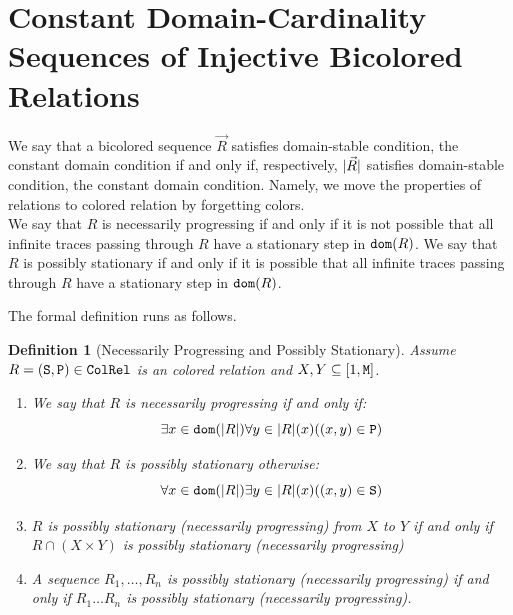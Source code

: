 \documentclass{lmcs}
\newtheorem{definition}[theorem]{Definition}
\begin{document}
\section{Constant Domain-Cardinality Sequences of Injective Bicolored Relations}



We say that  a bicolored sequence $\vec{R}$ satisfies domain-stable
condition, the constant domain condition if and only if, respectively, ${| \vec{R} |}$
satisfies domain-stable
condition, the constant domain condition. Namely, we move the properties of relations to 
colored relation by forgetting colors.
\\

We say that $R$ is necessarily progressing if and only if it is not possible that all infinite
traces passing through $R$ have a stationary step in ${\tt dom}(R)$. We say that $R$ is possibly 
stationary if and only if it is possible that all infinite traces passing through $R$ have a 
stationary step in ${\tt dom}(R)$.

The formal definition runs as follows.

\begin{definition}[Necessarily Progressing and Possibly Stationary]
\label{definition-possibly-stationary}
Assume $R=({\tt S},{\tt P}) \in {\tt ColRel}$ is an colored relation and 
$X,Y \subseteq [1,{\tt M}]$.

\begin{enumerate}
\item
We say that $R$ is \emph{necessarily progressing} if and only if:
$$
\exists x \in {\tt dom}({| R |}) \forall y \in {| R |}(x)((x,y) \in {\tt P})
$$

\item
We say that $R$ is \emph{possibly stationary} otherwise:
$$
\forall x \in {\tt dom}({| R |}) \exists y \in {| R |}(x)((x,y) \in {\tt S})
$$

\item
$R$ is possibly stationary (necessarily progressing) from $X$ to $Y$ if and only if 
$R \cap (X \times Y)$ is possibly stationary (necessarily progressing)

\item
A sequence $R_1, \ldots, R_n$ is possibly stationary (necessarily progressing) if and only if 
$R_1 \ldots R_n$ is possibly stationary (necessarily progressing).

\end{enumerate}
\end{definition}
\end{document}
